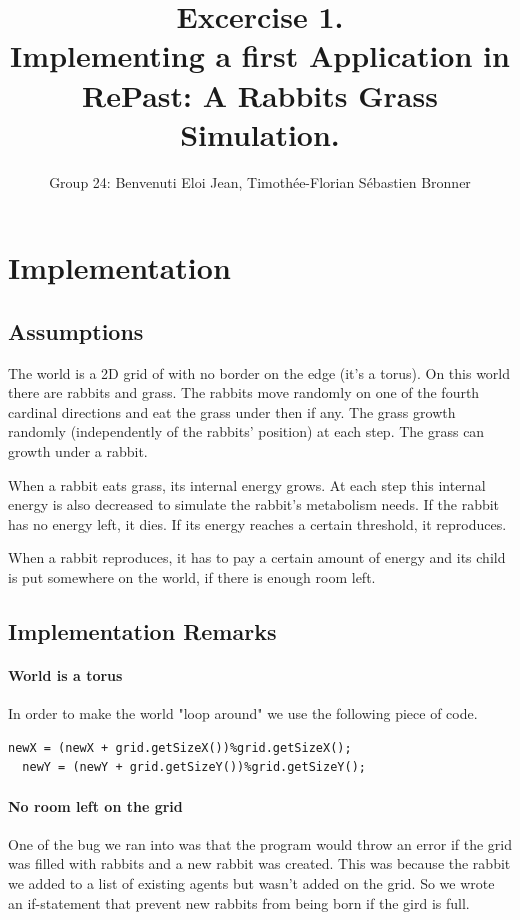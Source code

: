 \documentclass[11pt]{article}
\title{\bf Excercise 1.\\ Implementing a first Application in RePast: A Rabbits Grass Simulation.}
\author{Group 24: Benvenuti Eloi Jean, Timothée-Florian Sébastien Bronner}
\begin{document}
\lstset{language=java}
\maketitle

\section{Implementation}

\subsection{Assumptions}
The world is a 2D grid of with no border on the edge (it's a torus). On this world there are rabbits and grass. The rabbits move randomly on one of the fourth cardinal directions and eat the grass under then if any. The grass growth randomly (independently of the rabbits' position) at each step. The grass can growth under a rabbit.

When a rabbit eats grass, its internal energy grows. At each step this internal energy is also decreased to simulate the rabbit's metabolism needs. If the rabbit has no energy left, it dies. If its energy reaches a certain threshold, it reproduces.

When a rabbit reproduces, it has to pay a certain amount of energy and its child is put somewhere on the world, if there is enough room left.

\subsection{Implementation Remarks}
\paragraph{World is a torus} In order to make the world "loop around" we use the following piece of code.
\begin{lstlisting}[frame=single]
  newX = (newX + grid.getSizeX())%grid.getSizeX();
  newY = (newY + grid.getSizeY())%grid.getSizeY();
\end{lstlisting}

\paragraph{No room left on the grid}One of the bug we ran into was that the program would throw an error if the grid was filled with rabbits and a new rabbit was created. This was because the rabbit we added to a list of existing agents but wasn't added on the grid. So we wrote an if-statement that prevent new rabbits from being born if the gird is full.
\end{document}

